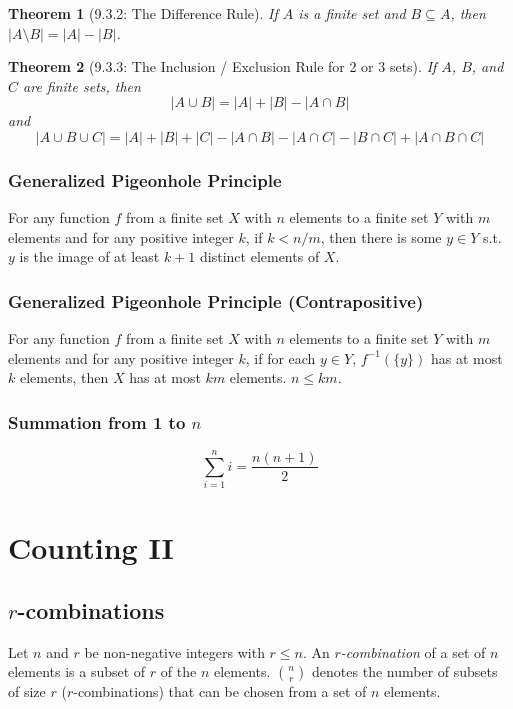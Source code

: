 \documentclass{article}
\theoremstyle{plain}
\newtheorem{theorem}{Theorem}[section]
\theoremstyle{definition}
\theoremstyle{remark}
\begin{document}
\begin{theorem}[9.3.2: The Difference Rule]
    If $A$ is a finite set and $B \subseteq A$, then $|A \setminus B| = |A| - |B|$.
\end{theorem}
 
\begin{theorem}[9.3.3: The Inclusion / Exclusion Rule for 2 or 3 sets]
    If $A$, $B$, and $C$ are finite sets, then
    \[ |A \cup B| = |A| + |B| - |A \cap B| \]
    and
    \[ |A \cup B \cup C| = |A| + |B| + |C| - |A \cap B| - |A \cap C| - |B \cap C| + |A \cap B \cap C| \]
\end{theorem}
 
\subsubsection*{Generalized Pigeonhole Principle}
For any function $f$ from a finite set $X$ with $n$ elements to a finite set $Y$ with $m$ elements and for any positive integer $k$, if $k < n/m$, then there is some $y \in Y$ s.t. $y$ is the image of at least $k+1$ distinct elements of $X$.
 
\subsubsection*{Generalized Pigeonhole Principle (Contrapositive)}
For any function $f$ from a finite set $X$ with $n$ elements to a finite set $Y$ with $m$ elements and for any positive integer $k$, if for each $y \in Y$, $f^{-1}(\{y\})$ has at most $k$ elements, then $X$ has at most $km$ elements. $n \leq km$.
 
\subsubsection*{Summation from 1 to $n$}
\[ \sum_{i=1}^{n} i = \frac{n(n+1)}{2} \]
 
\section{Counting II}
 
\subsection{$r$-combinations}
Let $n$ and $r$ be non-negative integers with $r \leq n$. An \emph{$r$-combination} of a set of $n$ elements is a subset of $r$ of the $n$ elements. $\binom{n}{r}$ denotes the number of subsets of size $r$ ($r$-combinations) that can be chosen from a set of $n$ elements.
 
\end{document}
